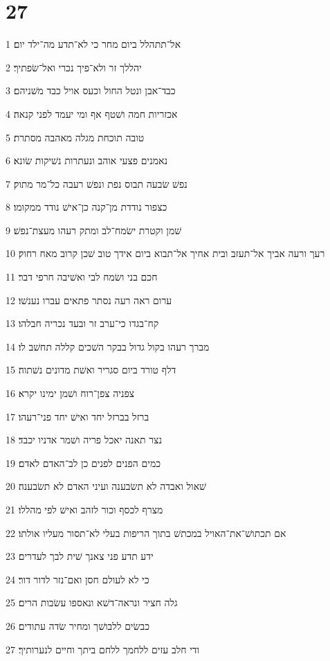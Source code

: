 \chapter{27}

\par 1 אל־תתהלל ביום מחר כי לא־תדע מה־ילד יום׃
\par 2 יהללך זר ולא־פיך נכרי ואל־שׂפתיך׃
\par 3 כבד־אבן ונטל החול וכעס אויל כבד משׁניהם׃
\par 4 אכזריות חמה ושׁטף אף ומי יעמד לפני קנאה׃
\par 5 טובה תוכחת מגלה מאהבה מסתרת׃
\par 6 נאמנים פצעי אוהב ונעתרות נשׁיקות שׂונא׃
\par 7 נפשׁ שׂבעה תבוס נפת ונפשׁ רעבה כל־מר מתוק׃
\par 8 כצפור נודדת מן־קנה כן־אישׁ נודד ממקומו׃
\par 9 שׁמן וקטרת ישׂמח־לב ומתק רעהו מעצת־נפשׁ׃
\par 10 רעך ורעה אביך אל־תעזב ובית אחיך אל־תבוא ביום אידך טוב שׁכן קרוב מאח רחוק׃
\par 11 חכם בני ושׂמח לבי ואשׁיבה חרפי דבר׃
\par 12 ערום ראה רעה נסתר פתאים עברו נענשׁו׃
\par 13 קח־בגדו כי־ערב זר ובעד נכריה חבלהו׃
\par 14 מברך רעהו בקול גדול בבקר השׁכים קללה תחשׁב לו׃
\par 15 דלף טורד ביום סגריר ואשׁת מדונים נשׁתוה׃
\par 16 צפניה צפן־רוח ושׁמן ימינו יקרא׃
\par 17 ברזל בברזל יחד ואישׁ יחד פני־רעהו׃
\par 18 נצר תאנה יאכל פריה ושׁמר אדניו יכבד׃
\par 19 כמים הפנים לפנים כן לב־האדם לאדם׃
\par 20 שׁאול ואבדה לא תשׂבענה ועיני האדם לא תשׂבענה׃
\par 21 מצרף לכסף וכור לזהב ואישׁ לפי מהללו׃
\par 22 אם תכתושׁ־את־האויל במכתשׁ בתוך הריפות בעלי לא־תסור מעליו אולתו׃
\par 23 ידע תדע פני צאנך שׁית לבך לעדרים׃
\par 24 כי לא לעולם חסן ואם־נזר לדור דור׃
\par 25 גלה חציר ונראה־דשׁא ונאספו עשׂבות הרים׃
\par 26 כבשׂים ללבושׁך ומחיר שׂדה עתודים׃
\par 27 ודי חלב עזים ללחמך ללחם ביתך וחיים לנערותיך׃


